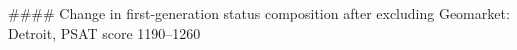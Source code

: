 #### Change in first-generation status composition after excluding Geomarket: Detroit, PSAT score 1190–1260
